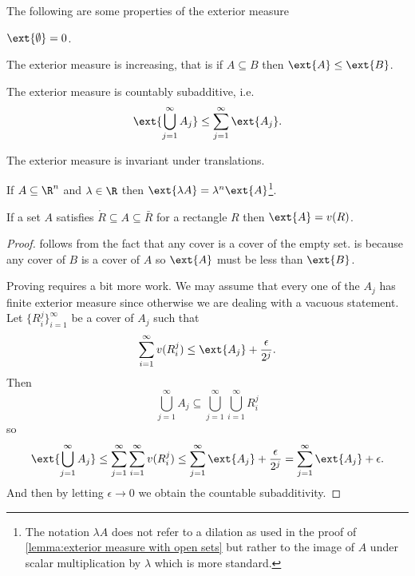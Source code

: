 \documentclass[12pt,oneside]{book}
\begin{document}
{
	\def\currentprefix{prop:properties of exterior measure}	
	\begin{proposition} \label{prop:properties of exterior measure}
		The following are some properties of the exterior measure
		\begin{points}
		\item {} \( \ext{\emptyset} = 0 \).
		\item {} The exterior measure is increasing, that is if \( A \subseteq B \) then \( \ext{A} \leq \ext{B} \). 
		\item {} The exterior measure is countably subadditive, i.e.
			\begin{equation*}
				\ext{\bigcup_{j = 1}^\infty A_j} \leq \sum_{j = 1}^{\infty} \ext{A_j}. 
			\end{equation*}
		\item {} The exterior measure is invariant under translations.
		\item {} If \( A \subseteq \R^n \) and \( \lambda \in \R \) then \( \ext{\lambda A} = \lambda^n \ext{A} \)\footnote{The notation \( \lambda A \) does not refer to a dilation as used in the proof of \cref{lemma:exterior measure with open sets} but rather to the image of \( A \) under scalar multiplication by \( \lambda \) which is more standard.}.
		\item {} If a set \( A \) satisfies \( \mathring{R} \subseteq A \subseteq \bar{R} \) for a rectangle \( R \) then \( \ext{A} = v(R) \).
		\end{points}
	\end{proposition}
	\begin{proof}
		 follows from the fact that any cover is a cover of the empty set.  is because any cover of \( B \) is a cover of \( A \) so \( \ext{A} \) must be less than \( \ext{B} \).

		Proving  requires a bit more work. We may assume that every one of the \( A_j \) has finite exterior measure since otherwise we are dealing with a vacuous statement. Let \( \{ R_i^j \}_{i = 1}^\infty \) be a cover of \( A_j \) such that 
		\begin{equation*}
			\sum_{i = 1}^{\infty} v(R_i^j) \leq \ext{A_j} + \frac{\epsilon}{2^j}. 
		\end{equation*}
		Then
		\begin{equation*}
			\bigcup_{j=1}^\infty A_j \subseteq \bigcup_{j=1}^\infty \bigcup_{i=1}^\infty R_i^j
		\end{equation*}
		so
		\begin{equation*}
			\ext{\bigcup_{j=1}^\infty A_j} \leq \sum_{j=1}^\infty \sum_{i=1}^\infty v(R_i^j) \leq \sum_{j = 1}^{\infty} \ext{A_j} + \frac{\epsilon}{2^j} = \sum_{j = 1}^{\infty} \ext{A_j} + \epsilon.
		\end{equation*}
		And then by letting \( \epsilon \to 0 \) we obtain the countable subadditivity.	


\end{proof}}
\end{document}
